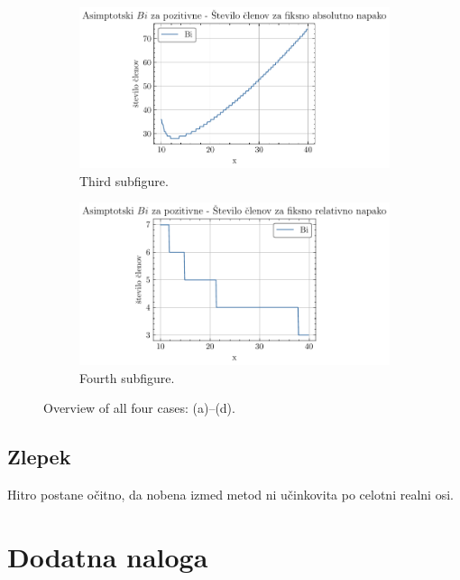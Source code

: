 \documentclass[slovene,11pt,a4paper]{article}
\begin{document}
\begin{figure}[H]
  \begin{subfigure}{0.48\textwidth}
    \centering
    \includegraphics[width=\linewidth]{graphs/pos_abs_err_n_bi.pdf}
    \caption{Third subfigure.}
  \end{subfigure}\hfill
  \begin{subfigure}{0.48\textwidth}
    \centering
    \includegraphics[width=\linewidth]{graphs/pos_rel_err_n_Bi.pdf}
    \caption{Fourth subfigure.}
  \end{subfigure}

  \caption{Overview of all four cases: (a)–(d).}
  \label{fig:fourplots}
\end{figure}


\subsection{Zlepek}

Hitro postane očitno, da nobena izmed metod ni učinkovita po celotni realni osi.


\section{Dodatna naloga}
\end{document}
